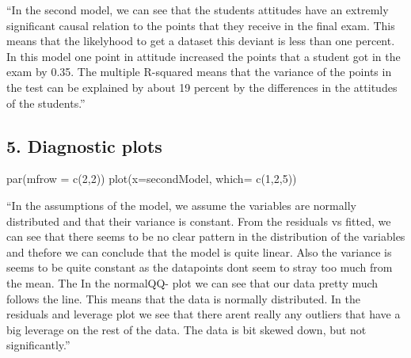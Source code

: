 \documentclass[]{article}
\begin{document}
``In the second model, we can see that the students attitudes have an
extremly significant causal relation to the points that they receive in
the final exam. This means that the likelyhood to get a dataset this
deviant is less than one percent. In this model one point in attitude
increased the points that a student got in the exam by 0.35. The
multiple R-squared means that the variance of the points in the test can
be explained by about 19 percent by the differences in the attitudes of
the students.''

\hypertarget{diagnostic-plots}{%
\subsection{5. Diagnostic plots}\label{diagnostic-plots}}

par(mfrow = c(2,2)) plot(x=secondModel, which= c(1,2,5))

``In the assumptions of the model, we assume the variables are normally
distributed and that their variance is constant. From the residuals vs
fitted, we can see that there seems to be no clear pattern in the
distribution of the variables and thefore we can conclude that the model
is quite linear. Also the variance is seems to be quite constant as the
datapoints dont seem to stray too much from the mean. The In the
normalQQ- plot we can see that our data pretty much follows the line.
This means that the data is normally distributed. In the residuals and
leverage plot we see that there arent really any outliers that have a
big leverage on the rest of the data. The data is bit skewed down, but
not significantly.''
\end{document}
